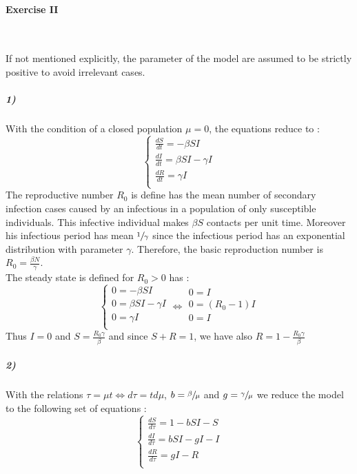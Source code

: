 \documentclass{article}
\begin{document}
\newpage
\paragraph{Exercise II}
\

If not mentioned explicitly, the parameter of the model are assumed to be strictly positive to avoid irrelevant cases.
\subparagraph{1)}
With the condition of a closed population $\mu = 0$, the equations reduce to :
$$ \displaystyle \left \{
    \begin{array}{ll}
        \frac{dS}{dt}=-\beta S I\\
		\frac{dI}{dt}= \beta S I - \gamma I \\
		\frac{dR}{dt}= \gamma I\\
    \end{array}
\right. $$
The reproductive number $R_0$ is define has the mean number of secondary infection cases caused by an infectious in a population of only susceptible individuals. This infective individual makes $\beta S $ contacts per unit time. Moreover his infectious period has mean $\sfrac{1}{\gamma}$ since the infectious period has an exponential distribution with parameter $\gamma$.
Therefore, the basic reproduction number is $R_0=\frac{\beta N}{ \gamma}$. \\
The steady state is defined for $R_0>0$ has :
$$ \displaystyle \left \{
    \begin{array}{ll}
        0=-\beta S I\\
		0= \beta S I - \gamma I \\
		0= \gamma I\\
    \end{array}
    \iff
     \begin{array}{ll}
        0=I\\
		0=(R_0-1)I \\
		0=I\\
    \end{array}
\right. $$
Thus $I=0$ and $S=\frac{R_0 \gamma }{\beta}$ and since $S+R=1$, we have also $R=1-\frac{R_0 \gamma }{\beta} $
\subparagraph{2)}
With the relations $\tau=\mu t \iff d\tau=t d\mu $, $b=\sfrac{\beta}{\mu}$ and $g=\sfrac{\gamma}{\mu}$ we reduce the model to the following set of equations :
$$ \displaystyle \left \{
    \begin{array}{ll}
        \frac{dS}{d\tau}=1-b S I-S\\
		\frac{dI}{d\tau}= b S I - g I -I \\
		\frac{dR}{d\tau}= g I-R\\
    \end{array}
\right. $$
\end{document}
